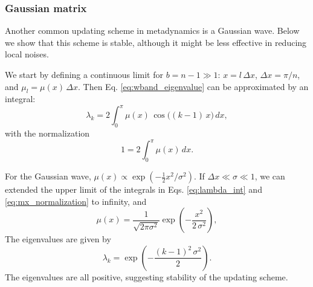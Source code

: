 \documentclass[reprint]{revtex4-1}
\begin{document}
\subsubsection{Gaussian matrix}



Another common updating scheme
in metadynamics is a Gaussian wave.
%
Below we show that this scheme
is stable, although
it might be less effective
in reducing local noises.



We start by defining
a continuous limit
for $b = n - 1 \gg 1$:
$x = l \, \Delta x$,
$\Delta x = \pi/n$,
and
$\mu_l = \mu(x) \, \Delta x$.
%
Then
Eq. \eqref{eq:wband_eigenvalue}
can be approximated by an integral:
%
\begin{equation}
\lambda_k
=
2 \int_0^\pi
  \mu(x) \, \cos \bigl( (k-1) \, x \bigr) \, dx,
\label{eq:lambda_int}
\end{equation}
%
with the normalization
%
\begin{equation}
1 = 2 \int_0^\pi \mu(x) \, dx.
\label{eq:mx_normalization}
\end{equation}



For the Gaussian wave,
$\mu(x) \propto \exp(-\frac{1}{2} x^2/\sigma^2)$.
%
If $\Delta x \ll \sigma \ll 1$,
we can extended
the upper limit of the integrals
in Eqs. \eqref{eq:lambda_int}
and \eqref{eq:mx_normalization}
to infinity, and
%
\begin{equation}
\mu(x)
=
\frac{            1            }
     { \sqrt{ 2 \pi \sigma^2 } }
%
\exp\left(
      -\frac{       x^2     }
            { 2 \, \sigma^2 }
    \right),
\end{equation}
%
%
The eigenvalues are given by
%
\begin{equation}
\lambda_k
=
\exp\left(
      -\frac{ (k - 1)^2 \, \sigma^2 }
            {           2           }
    \right).
\label{eq:lambda_Gaussian}
\end{equation}
%
The eigenvalues are all positive,
suggesting stability of the updating scheme.
\end{document}
